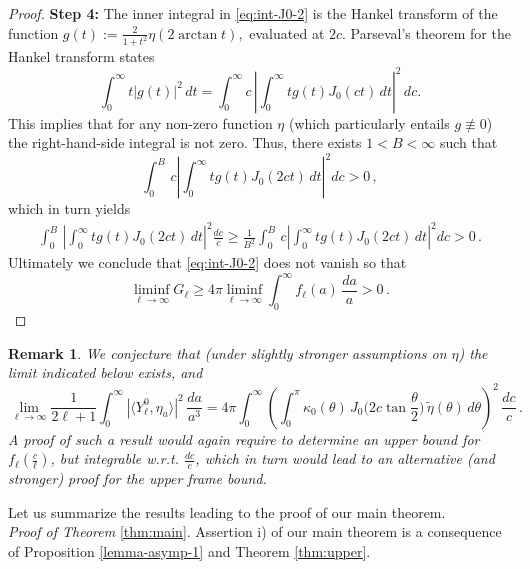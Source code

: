 \documentclass[a4paper,11pt,DIV=11,%
abstract=on%
]{scrartcl}
\newtheorem{rem}[thm]{Remark}
\begin{document}
\begin{proof}
	\vspace{0.3\baselineskip}\noindent
\textbf{Step 4:}	The inner integral in \eqref{eq:int-J0-2} is the Hankel transform of the function 
	$g(t):= \frac{2}{1+t^2} \eta(2\arctan t),$ evaluated at $2c$.
	Parseval's theorem for the Hankel transform \cite{MacAuley1939} states
	$$
	\int_0^\infty t |g(t)|^2\,  d t
	= \int_0^\infty c \, \left|\int_0^\infty  t g(t) J_0(ct) \,d t \right|^2  \, d c.
	$$
	This implies that for any non-zero function $\eta$ (which particularly entails $g\not\equiv 0$)
	the right-hand-side integral is not zero. Thus, there exists $1<B<\infty$ such that 
	\[
	\int_0^B \, c\left|\int_0^\infty t g(t) J_0(2ct)\, dt \right|^2 dc>0\,,
	\]
	which in turn yields
	\begin{align*}
		\int_0^B \, \left|\int_0^\infty t g(t) J_0(2ct)\, dt \right|^2 \frac{dc}{c}
		\geq\frac{1}{B^2}\int_0^B \, c\left|\int_0^\infty t g(t) J_0(2ct)\, dt \right|^2 dc>0\,.
	\end{align*}
	Ultimately we conclude that \eqref{eq:int-J0-2} does not vanish so that
	\begin{equation*}\liminf_{\ell\to\infty} G_\ell
		\ge 4\pi\liminf_{\ell\to\infty} \int_0^\infty f_\ell(a)\,\frac{da}{a} >0\,.
		\tag*{\qedhere}
	\end{equation*}
\end{proof}

\begin{rem}
	We conjecture that (under slightly stronger assumptions on $\eta$) the limit 
	indicated below exists,
	and
	$$\lim_{\ell\to\infty}\frac{1}{2\ell+1}
	\int_0^\infty |\langle Y_\ell^0, \eta_a \rangle|^2 \, \frac{da}{a^3}
	=4\pi\int_0^\infty \left(
	\int_0^\pi \kappa_0(\theta)\, J_0\biggl(2c\tan\frac\theta2\biggr)\,
	\widetilde\eta(\theta)\, d\theta\right)^2\,\frac{dc}{c}\,.$$
	A proof of such a	result would again require to determine an upper bound  for
	$f_\ell(\frac{c}{\ell})$, but integrable w.r.t. $\frac{dc}{c}$, which in turn would lead to an
	alternative (and stronger) proof for the upper frame bound.
\end{rem}


Let us summarize the results leading to the proof of our main theorem.
\\

\emph{Proof of Theorem} \ref{thm:main}.
Assertion i) of our main theorem is a consequence of Proposition \ref{lemma-asymp-1}
and Theorem \ref{thm:upper}.
\end{document}
